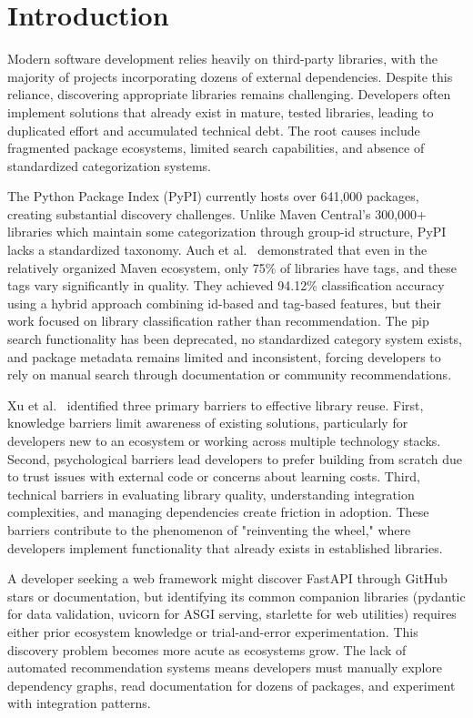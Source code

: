 \documentclass[runningheads]{llncs}
\begin{document}
\section{Introduction}

Modern software development relies heavily on third-party libraries, with the majority of projects incorporating dozens of external dependencies. Despite this reliance, discovering appropriate libraries remains challenging. Developers often implement solutions that already exist in mature, tested libraries, leading to duplicated effort and accumulated technical debt. The root causes include fragmented package ecosystems, limited search capabilities, and absence of standardized categorization systems.

The Python Package Index (PyPI) currently hosts over 641,000 packages, creating substantial discovery challenges. Unlike Maven Central's 300,000+ libraries which maintain some categorization through group-id structure, PyPI lacks a standardized taxonomy. Auch et al.~\cite{auch2024} demonstrated that even in the relatively organized Maven ecosystem, only 75\% of libraries have tags, and these tags vary significantly in quality. They achieved 94.12\% classification accuracy using a hybrid approach combining id-based and tag-based features, but their work focused on library classification rather than recommendation. The pip search functionality has been deprecated, no standardized category system exists, and package metadata remains limited and inconsistent, forcing developers to rely on manual search through documentation or community recommendations.

Xu et al.~\cite{xu2020} identified three primary barriers to effective library reuse. First, knowledge barriers limit awareness of existing solutions, particularly for developers new to an ecosystem or working across multiple technology stacks. Second, psychological barriers lead developers to prefer building from scratch due to trust issues with external code or concerns about learning costs. Third, technical barriers in evaluating library quality, understanding integration complexities, and managing dependencies create friction in adoption. These barriers contribute to the phenomenon of "reinventing the wheel," where developers implement functionality that already exists in established libraries.

A developer seeking a web framework might discover FastAPI through GitHub stars or documentation, but identifying its common companion libraries (pydantic for data validation, uvicorn for ASGI serving, starlette for web utilities) requires either prior ecosystem knowledge or trial-and-error experimentation. This discovery problem becomes more acute as ecosystems grow. The lack of automated recommendation systems means developers must manually explore dependency graphs, read documentation for dozens of packages, and experiment with integration patterns.
\end{document}
